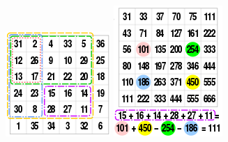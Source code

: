 \begin{figure}[h!]
	\centering
	\includegraphics[width=0.35\linewidth]{img/prefix_sum_2D_a}
	\includegraphics[width=0.35\linewidth]{img/prefix_sum_2D_b}
	\label{fig:prefixsum2da}
\end{figure}
